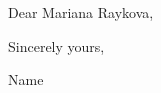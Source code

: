 \documentclass{article}
\begin{document}
\bigskip

Dear Mariana Raykova,

\bigskip %



\bigskip %

Sincerely yours,

\vspace{-10pt} %

\vspace{50pt} %

\vspace{-10pt} %
Name
\end{document}

